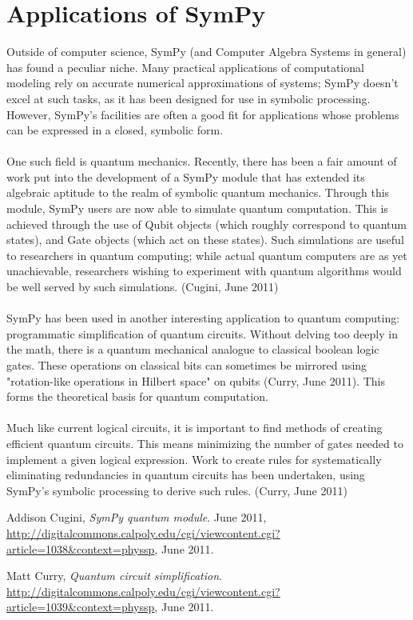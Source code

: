 \documentclass[11pt,a4paper,oneside]{report}
\begin{document}
\section*{Applications of SymPy}
Outside of computer science, SymPy (and Computer Algebra Systems in general) has found a peculiar niche. Many practical applications of computational modeling rely on accurate numerical approximations of systems; SymPy doesn't excel at such tasks, as it has been designed for use in symbolic processing. However, SymPy's facilities are often a good fit for applications whose problems can be expressed in a closed, symbolic form.\\\\
One such field is quantum mechanics. Recently, there has been a fair amount of work put into the development of a SymPy module that has extended its algebraic aptitude to the realm of symbolic quantum mechanics. Through this module, SymPy users are now able to simulate quantum computation. This is achieved through the use of Qubit objects (which roughly correspond to quantum states), and Gate objects (which act on these states). Such simulations are useful to researchers in quantum computing; while actual quantum computers are as yet unachievable, researchers wishing to experiment with quantum algorithms would be well served by such simulations. (Cugini, June 2011)\\\\
SymPy has been used in another interesting application to quantum computing: programmatic simplification of quantum circuits. Without delving too deeply in the math, there is a quantum mechanical analogue to classical boolean logic gates. These operations on classical bits can sometimes be mirrored using "rotation-like operations in Hilbert space" on qubits (Curry, June 2011). This forms the theoretical basis for quantum computation.\\\\
Much like current logical circuits, it is important to find methods of creating efficient quantum circuits. This means minimizing the number of gates needed to implement a given logical expression. Work to create rules for systematically eliminating redundancies in quantum circuits has been undertaken, using SymPy's symbolic processing to derive such rules. (Curry, June 2011)
\begin{thebibliography}{9}

  Addison Cugini,
  \emph{SymPy quantum module}.
   June 2011, 
   \url{http://digitalcommons.calpoly.edu/cgi/viewcontent.cgi?article=1038&context=physsp},
  June 2011.

  Matt Curry,
  \emph{Quantum circuit simplification}.
  \url{http://digitalcommons.calpoly.edu/cgi/viewcontent.cgi?article=1039&context=physsp},
  June 2011.

\end{thebibliography}
\end{document}

